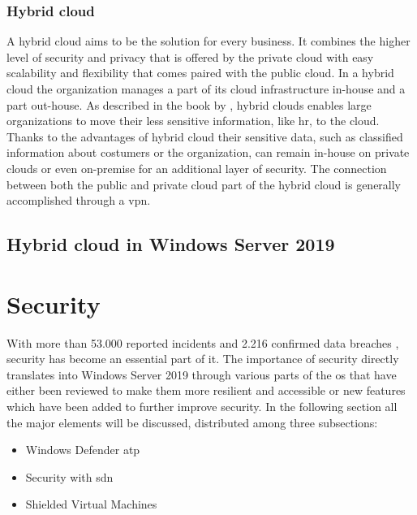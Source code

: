 \subsubsection{Hybrid cloud}
A hybrid cloud aims to be the solution for every business. It combines the higher level of security and privacy that is offered by the private cloud with easy scalability and flexibility that comes paired with the public cloud. In a hybrid cloud the organization manages a part of its cloud infrastructure in-house and a part out-house. As described in the book by \textcite{Sarna2010}, hybrid clouds enables large organizations to move their less sensitive information, like \acrfull{hr}, to the cloud. Thanks to the advantages of hybrid cloud their sensitive data, such as classified information about costumers or the organization, can remain in-house on private clouds or even on-premise for an additional layer of security. The connection between both the public and private cloud part of the hybrid cloud is generally accomplished through a \acrfull{vpn}.


\subsection{Hybrid cloud in Windows Server 2019}
\clearpage

\section{Security}
With more than 53.000 reported incidents and 2.216 confirmed data breaches \autocite{Verizon2018}, security has become an essential part of \acrshort{it}. The importance of security directly translates into Windows Server 2019 through various parts of the \acrshort{os} that have either been reviewed to make them more resilient and accessible or new features which have been added to further improve security. In the following section all the major elements will be discussed, distributed among three subsections:
\begin{itemize}
	\item Windows Defender \acrfull{atp}
	\item Security with \acrfull{sdn}
	\item Shielded Virtual Machines
\end{itemize}

